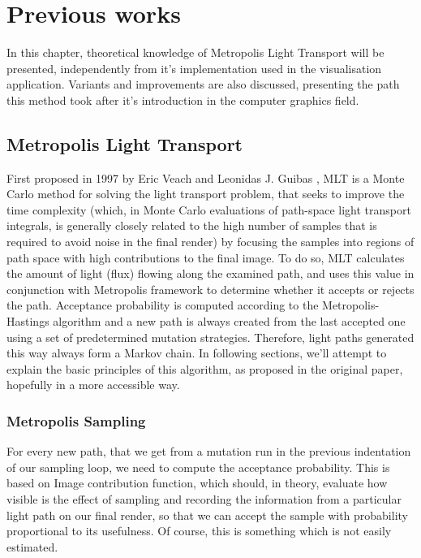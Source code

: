 \chapter{Previous works}\label{chap:intro}

In this chapter, theoretical knowledge of Metropolis Light Transport will be presented, independently from it's implementation used in the visualisation application. Variants and improvements are also discussed, presenting the path this method took after it's introduction in the computer graphics field.

\section{Metropolis Light Transport}

First proposed in 1997 by Eric Veach and Leonidas J. Guibas \cite{Veach:1997:MLT:258734.258775}, MLT is a Monte Carlo method for solving the light transport problem, that seeks to improve the time complexity (which, in Monte Carlo evaluations of path-space light transport integrals, is generally closely related to the high number of samples that is required to avoid noise in the final render) by focusing the samples into regions of path space with high contributions to the final image. To do so, MLT calculates the amount of light (flux) flowing along the examined path, and uses this value in conjunction with Metropolis framework to determine whether it accepts or rejects the path. Acceptance probability is computed according to the Metropolis-Hastings algorithm and a new path is always created from the last accepted one using a set of predetermined mutation strategies. Therefore, light paths generated this way always form a Markov chain. In following sections, we'll attempt to explain the basic principles of this algorithm, as proposed in the original paper, hopefully in a more accessible way.

\subsection{Metropolis Sampling}

For every new path, that we get from a mutation run in the previous indentation of our sampling loop, we need to compute the acceptance probability. This is based on Image contribution function, which should, in theory, evaluate how visible is the effect of sampling and recording the information from a particular light path on our final render, so that we can accept the sample with probability proportional to its usefulness. Of course, this is something which is not easily estimated.

